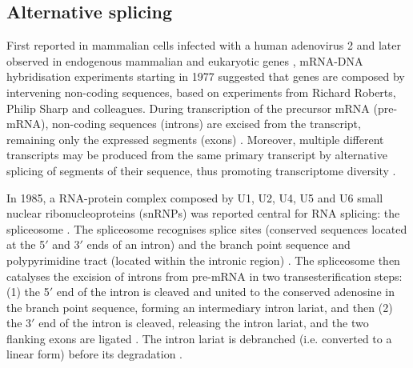 
\subsection{Alternative splicing}



First reported in mammalian cells infected with a human adenovirus 2 \cite{berget:1977wp,chow:1977wn} and later observed in endogenous mammalian and eukaryotic genes \cite{brack:1977we,early:1980wq}, mRNA-DNA hybridisation experiments starting in 1977 suggested that genes are composed by intervening non-coding sequences, based on experiments from Richard Roberts, Philip Sharp and colleagues. During transcription of the precursor mRNA (pre-mRNA), non-coding sequences (introns) are excised from the transcript, remaining only the expressed segments (exons) \cite{berget:1977wp,chow:1977wn,gilbert:1978wr}. Moreover, multiple different transcripts may be produced from the same primary transcript by alternative splicing of segments of their sequence, thus promoting transcriptome diversity \cite{berget:1977wp,chow:1977wn,chow:1978wk,nevins:1978tt,schmucker:2000wf}.

In 1985, a RNA-protein complex composed by U1, U2, U4, U5 and U6 small nuclear ribonucleoproteins (snRNPs) was reported central for RNA splicing: the spliceosome \cite{grabowski:1985vm}. The spliceosome recognises splice sites (conserved sequences located at the 5$'$ and 3$'$ ends of an intron) and the branch point sequence and polypyrimidine tract (located within the intronic region) \cite{mount:1982tu,black:1985ul}. The spliceosome then catalyses the excision of introns from pre-mRNA in two transesterification steps: (1) the 5$'$ end of the intron is cleaved and united to the conserved adenosine in the branch point sequence, forming an intermediary intron lariat, and then (2) the 3$'$ end of the intron is cleaved, releasing the intron lariat, and the two flanking exons are ligated \cite{grabowski:1985vm,ruskin:1985vl,horowitz:1993wq}. The intron lariat is debranched (i.e. converted to a linear form) before its degradation \cite{ruskin:1985vl,arenas:1987vc}.

